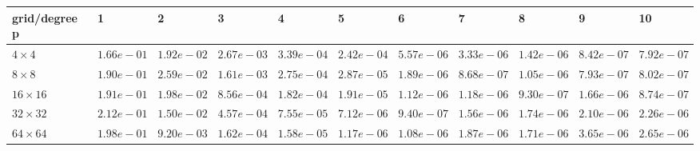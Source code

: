 \begin{tabular}{lllllllllll}
\hline
 grid/degree p   & 1          & 2          & 3          & 4          & 5          & 6          & 7          & 8          & 9          & 10         \\
\hline
 $4 \times 4$    & $1.66e-01$ & $1.92e-02$ & $2.67e-03$ & $3.39e-04$ & $2.42e-04$ & $5.57e-06$ & $3.33e-06$ & $1.42e-06$ & $8.42e-07$ & $7.92e-07$ \\
 $8 \times 8$    & $1.90e-01$ & $2.59e-02$ & $1.61e-03$ & $2.75e-04$ & $2.87e-05$ & $1.89e-06$ & $8.68e-07$ & $1.05e-06$ & $7.93e-07$ & $8.02e-07$ \\
 $16 \times 16$  & $1.91e-01$ & $1.98e-02$ & $8.56e-04$ & $1.82e-04$ & $1.91e-05$ & $1.12e-06$ & $1.18e-06$ & $9.30e-07$ & $1.66e-06$ & $8.74e-07$ \\
 $32 \times 32$  & $2.12e-01$ & $1.50e-02$ & $4.57e-04$ & $7.55e-05$ & $7.12e-06$ & $9.40e-07$ & $1.56e-06$ & $1.74e-06$ & $2.10e-06$ & $2.26e-06$ \\
 $64 \times 64$  & $1.98e-01$ & $9.20e-03$ & $1.62e-04$ & $1.58e-05$ & $1.17e-06$ & $1.08e-06$ & $1.87e-06$ & $1.71e-06$ & $3.65e-06$ & $2.65e-06$ \\
\hline
\end{tabular}